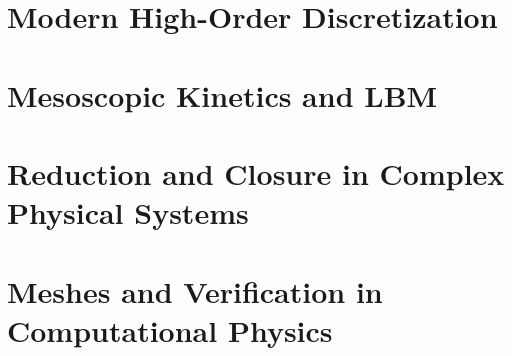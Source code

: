 \documentclass[11pt,openany]{book}
\begin{document}
\part{Modern High-Order Discretization}





\part{Mesoscopic Kinetics and LBM}


\part{Reduction and Closure in Complex Physical Systems}



\part{Meshes and Verification in Computational Physics}



\backmatter

\clearpage
{}
{}
\printindex
\end{document}
